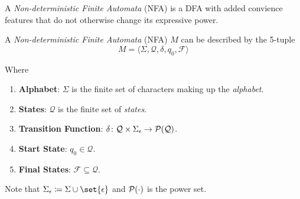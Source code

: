 A \textit{Non-deterministic Finite Automata} (NFA) is a DFA with added convience features that do not otherwise change its expressive power.

\begin{definition}
    A \textit{Non-deterministic Finite Automata} (NFA) $M$ can be described by the 5-tuple
    \begin{equation}
        M = \langle
            \Sigma,
            \mathcal{Q},
            \delta,
            q_0,
            \mathcal{F}
        \rangle
    \end{equation}
    
    Where
    \begin{enumerate}
        \item \textbf{Alphabet}: $\Sigma$ is the finite set of characters making up the \textit{alphabet}.
        \item \textbf{States}: $\mathcal{Q}$ is the finite set of \textit{states}.
        \item \textbf{Transition Function}: $\delta \colon \mathcal{Q} \times \Sigma_{\epsilon} \to \mathcal{P}(\mathcal{Q})$.
        \item \textbf{Start State}: $q_0 \in \mathcal{Q}$.
        \item \textbf{Final States}: $\mathcal{F} \subseteq \mathcal{Q}$.
    \end{enumerate}
    
    Note that $\Sigma_{\epsilon} \coloneqq \Sigma \cup \set{\epsilon}$ and $\mathcal{P}(\cdot)$ is the power set.
\end{definition}

